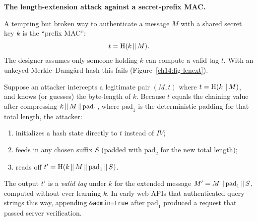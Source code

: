 \begin{attackbox}
\textbf{The length-extension attack against a secret-prefix MAC.}

A tempting but broken way to authenticate a message $M$ with a shared secret key $k$ is the ``prefix MAC'':
\[
  t = \operatorname{H}(k \,\|\, M).
\]
The designer assumes only someone holding $k$ can compute a valid tag $t$. With an unkeyed Merkle--Damg\aa{}rd hash this fails (Figure~\ref{ch14:fig-lenext}).

Suppose an attacker intercepts a legitimate pair $(M, t)$ where $t = \operatorname{H}(k \,\|\, M)$, and knows (or guesses) the byte-length of $k$. Because $t$ equals the chaining value after compressing $k \,\|\, M \,\|\, \text{pad}_1$, where $\text{pad}_1$ is the deterministic padding for that total length, the attacker:
\begin{enumerate}
  \item initializes a hash state directly to $t$ instead of $\mathit{IV}$;
  \item feeds in any chosen suffix $S$ (padded with $\text{pad}_2$ for the new total length);
  \item reads off $t' = \operatorname{H}(k \,\|\, M \,\|\, \text{pad}_1 \,\|\, S)$.
\end{enumerate}
The output $t'$ is a \emph{valid tag} under $k$ for the extended message $M' = M \,\|\, \text{pad}_1 \,\|\, S$, computed without ever learning $k$. In early web APIs that authenticated query strings this way, appending \verb|&admin=true| after $\text{pad}_1$ produced a request that passed server verification.
\end{attackbox}

